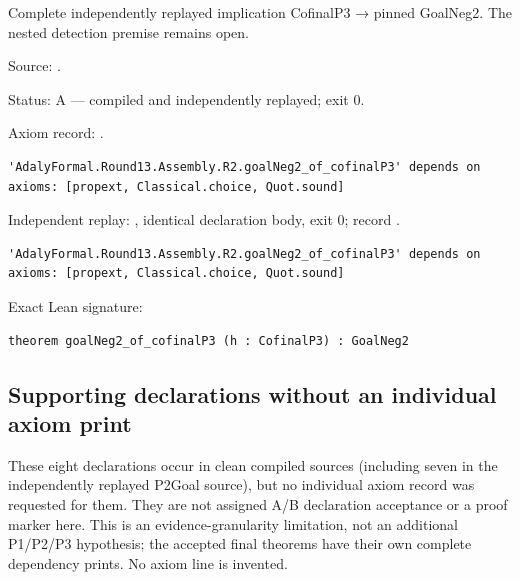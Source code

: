 \begin{theorem}[bp-583]
\label{bp-583}
\leanok
Complete independently replayed implication CofinalP3 → pinned GoalNeg2. The nested detection premise remains open.

\par Source: \texttt{}.
\par Status: A — compiled and independently replayed; exit 0.
\par Axiom record: \texttt{}.
\begin{verbatim}
'AdalyFormal.Round13.Assembly.R2.goalNeg2_of_cofinalP3' depends on axioms: [propext, Classical.choice, Quot.sound]
\end{verbatim}
\par Independent replay: \texttt{}, identical declaration body, exit 0; record \texttt{}.
\begin{verbatim}
'AdalyFormal.Round13.Assembly.R2.goalNeg2_of_cofinalP3' depends on axioms: [propext, Classical.choice, Quot.sound]
\end{verbatim}
\par Exact Lean signature:
\begin{verbatim}
theorem goalNeg2_of_cofinalP3 (h : CofinalP3) : GoalNeg2
\end{verbatim}
\end{theorem}

\subsection{Supporting declarations without an individual axiom print}

These eight declarations occur in clean compiled sources (including seven in the independently replayed P2Goal source), but no individual axiom record was requested for them. They are not assigned A/B declaration acceptance or a proof marker here. This is an evidence-granularity limitation, not an additional P1/P2/P3 hypothesis; the accepted final theorems have their own complete dependency prints. No axiom line is invented.

